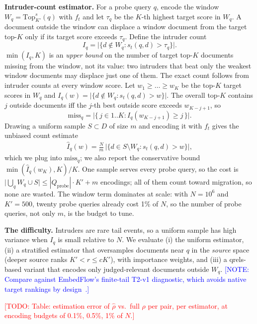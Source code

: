 \documentclass[conference]{IEEEtran}
\newcommand{\todo}[1]{\textcolor{red}{[TODO: #1]}}
\newcommand{\note}[1]{\textcolor{blue}{[NOTE: #1]}}
\newcommand{\topk}{\mathrm{Top}}
\newcommand{\win}{W}
\begin{document}
\textbf{Intruder-count estimator.} For a probe query $q$, encode the window
$\win_q = \topk_{K'}^{s}(q)$ with $f_t$ and let $\tau_q$ be the $K$-th highest target
score in $\win_q$. A document outside the window can displace a window document from
the target top-$K$ only if its target score exceeds $\tau_q$. Define the intruder count
\[
I_q = \lvert\{d \notin \win_q : s_t(q,d) > \tau_q\}\rvert .
\]
$\min(I_q, K)$ is an \emph{upper bound} on the number of target top-$K$ documents missing
from the window, not its value: two intruders that beat only the weakest window
documents may displace just one of them. The exact count follows from intruder counts
at every window score. Let $w_1 \ge \dots \ge w_K$ be the top-$K$ target scores in
$\win_q$ and $I_q(w) = \lvert\{d\notin\win_q : s_t(q,d) > w\}\rvert$. The overall top-$K$
contains $j$ outside documents iff the $j$-th best outside score exceeds $w_{K-j+1}$, so
\[
\mathrm{miss}_q = \bigl\lvert\{\, j \in 1..K : I_q(w_{K-j+1}) \ge j \,\}\bigr\rvert .
\]
Drawing a uniform sample $S\subset D$ of size $m$ and encoding it with $f_t$ gives the
unbiased count estimate
\begin{gather*}
\hat I_q(w) = \frac{N}{m}\,\lvert\{d \in S\setminus \win_q : s_t(q,d) > w\}\rvert ,
\end{gather*}
which we plug into $\mathrm{miss}_q$; we also report the conservative bound
$\min(\hat I_q(w_K), K)/K$.
One sample serves every probe query, so the cost is
$\lvert\bigcup_q \win_q \cup S\rvert \le |Q_{\text{probe}}|\cdot K' + m$ encodings; all of them
count toward migration, so none are wasted. The window term dominates at scale: with
$N{=}10^6$ and $K'{=}500$, twenty probe queries already cost 1\% of $N$, so the number of
probe queries, not only $m$, is the budget to tune.

\textbf{The difficulty.} Intruders are rare tail events, so a uniform sample has high
variance when $I_q$ is small relative to $N$. We evaluate (i) the uniform estimator,
(ii) a stratified estimator that oversamples documents near $q$ in the \emph{source}
space (deeper source ranks $K' < r \le cK'$), with importance weights, and (iii) a
qrels-based variant that encodes only judged-relevant documents outside $\win_q$.
\note{Compare against EmbedFlow's finite-tail T2-v1 diagnostic, which avoids native
target rankings by design~\cite{embedflow}.}

\todo{Table: estimation error of $\hat\rho$ vs.\ full $\rho$ per pair, per estimator,
at encoding budgets of 0.1\%, 0.5\%, 1\% of $N$.}
\end{document}
